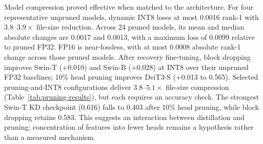 \documentclass[runningheads,a4paper]{llncs}
\begin{document}
Model compression proved effective when matched to the architecture. For four representative unpruned models, dynamic INT8 loses at most 0.0016 rank-1 with $3.8$--$3.9\times$ file-size reduction. Across 24 pruned models, its mean and median absolute changes are 0.0017 and 0.0013, with a maximum loss of 0.0099 relative to pruned FP32. FP16 is near-lossless, with at most 0.0008 absolute rank-1 change across those pruned models. After recovery fine-tuning, block dropping improves Swin-T ($+$0.010) and Swin-B ($+$0.028) at INT8 over their unpruned FP32 baselines; 10\% head pruning improves DeiT3-S ($+$0.013 to 0.565). Selected pruning-and-INT8 configurations deliver $3.8$--$5.1\times$ file-size compression (Table~\ref{tab:pruning-results}), but each requires an accuracy check. The strongest Swin-T KD checkpoint (0.616) falls to 0.403 after 10\% head pruning, while block dropping retains 0.583. This suggests an interaction between distillation and pruning; concentration of features into fewer heads remains a hypothesis rather than a measured mechanism.
\end{document}
